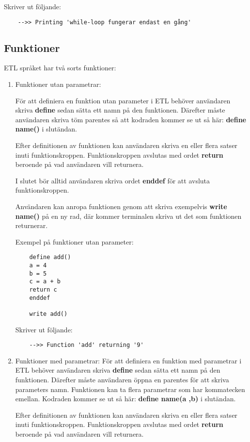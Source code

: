 \documentclass{TDP019mall}
\begin{document}
Skriver ut följande:
\begin{verbatim}
    -->> Printing 'while-loop fungerar endast en gång'
\end{verbatim}


\subsection{Funktioner}
ETL språket har två sorts funktioner:
\begin{enumerate}
\item Funktioner utan parametrar:

För att definiera en funktion utan parameter i ETL behöver användaren skriva \textbf{define} sedan sätta ett namn på den funktionen. 
Därefter måste användaren skriva töm parentes så att kodraden kommer se ut så här: \textbf{define name()} i slutändan.
 
Efter definitionen av funktionen kan användaren skriva en eller flera satser inuti funktionskroppen. Funktionskroppen avslutas med 
ordet \textbf{return} beroende på vad användaren vill returnera.
 
I slutet bör alltid användaren skriva ordet \textbf{enddef} för att avsluta funktionskroppen. 
 
Användaren kan anropa funktionen genom att skriva exempelvis \textbf{write name()} på en ny rad, där kommer terminalen skriva 
ut det som funktionen returnerar.  
 
Exempel på funktioner utan parameter:
\begin{verbatim}
    define add()
    a = 4
    b = 5
    c = a + b
    return c
    enddef

    write add()
\end{verbatim}
 
Skriver ut följande:
\begin{verbatim}
    -->> Function 'add' returning '9'
\end{verbatim}

 
\item Funktioner med parametrar:
För att definiera en funktion med parametrar i ETL behöver användaren skriva \textbf{define} sedan sätta ett namn på den funktionen. 
Därefter måste användaren öppna en parentes för att skriva parameters namn. Funktionen kan ta flera parametrar som har kommatecken emellan. 
Kodraden kommer se ut så här: \textbf{define name(a ,b)} i slutändan.
 
Efter definitionen av funktionen kan användaren skriva en eller flera satser inuti funktionskroppen. Funktionskroppen avslutas med 
ordet \textbf{return} beroende på vad användaren vill returnera.
 

\end{enumerate}
\end{document}
